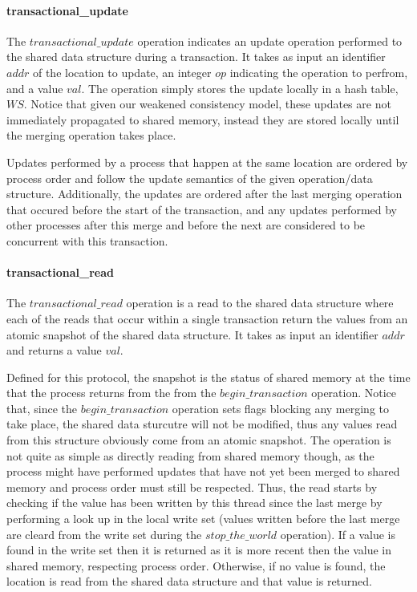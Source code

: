 \documentclass[11pt,letterpaper]{article}
\begin{document}
\paragraph{transactional\_update}
The $\mathit{transactional\_update}$ operation indicates an update operation
performed to the shared data structure during a transaction.
It takes as input an identifier $\mathit{addr}$ of the location to update,
an integer $\mathit{op}$ indicating the operation to perfrom, and a value $\mathit{val}$.
The operation simply stores the update locally in a hash table, $\mathit{WS}$.
Notice that given our weakened consistency model, these updates are not
immediately propagated to shared memory, instead
they are stored locally until the merging operation takes place.

Updates performed by a process that happen at the same location are ordered by process order and
follow the update semantics of the given operation/data structure.
Additionally, the updates are ordered after the last merging operation that occured before
the start of the transaction, and any updates performed by other processes after this merge and before
the next are considered to be concurrent with this transaction.


\paragraph{transactional\_read}
The $\mathit{transactional\_read}$ operation is a read to the shared data structure
where each of the reads that occur within a single transaction return the values from
an atomic snapshot of the shared data structure.
It takes as input an identifier $\mathit{addr}$ and returns a value $\mathit{val}$.

Defined for this protocol, the snapshot is the status of shared memory at the time that
the process returns from the from the $\mathit{begin\_transaction}$ operation.
Notice that, since the $\mathit{begin\_transaction}$ operation
sets flags blocking any merging to take place, the shared data sturcutre
will not be modified, thus any values read from this structure obviously come from
an atomic snapshot.
The operation is not quite as simple as directly reading from shared memory though,
as the process might have performed updates that have not yet been merged to shared memory
and process order must still be respected.
Thus, the read starts by checking if the value has been written by this
thread since the last merge by performing a look up in the local write set
(values written before the last merge are cleard from the write set during
the $\mathit{stop\_the\_world}$ operation).
If a value is found in the write set then it is returned as it is more recent
then the value in shared memory, respecting process order.
Otherwise, if no value is found,
the location is read from the shared data structure and that value is returned.
\end{document}
